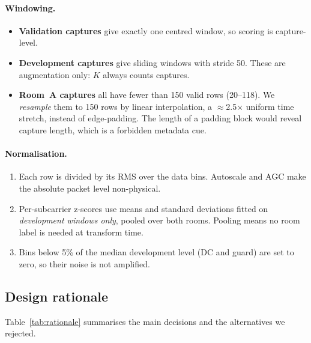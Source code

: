 \documentclass[11pt,a4paper]{article}
\begin{document}
\paragraph{Windowing.}
\begin{itemize}
  \item \textbf{Validation captures} give exactly one centred window, so scoring is capture-level.
  \item \textbf{Development captures} give sliding windows with stride 50. These are augmentation only: $K$ always counts captures.
  \item \textbf{Room~A captures} all have fewer than 150 valid rows (20--118). We \emph{resample} them to 150 rows by linear interpolation, a $\approx$2.5$\times$ uniform time stretch, instead of edge-padding. The length of a padding block would reveal capture length, which is a forbidden metadata cue.
\end{itemize}

\paragraph{Normalisation.}
\begin{enumerate}
  \item Each row is divided by its RMS over the data bins. Autoscale and AGC make the absolute packet level non-physical.
  \item Per-subcarrier z-scores use means and standard deviations fitted on \emph{development windows only}, pooled over both rooms. Pooling means no room label is needed at transform time.
  \item Bins below 5\% of the median development level (DC and guard) are set to zero, so their noise is not amplified.
\end{enumerate}

\subsection{Design rationale}
Table~\ref{tab:rationale} summarises the main decisions and the alternatives we rejected.
\end{document}
